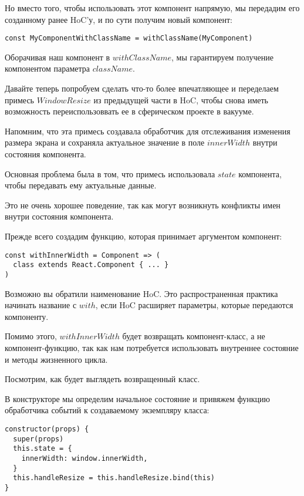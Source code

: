 Но вместо того, чтобы использовать этот компонент напрямую, мы передадим его созданному ранее HoC'у, и по сути получим новый компонент:

\begin{lstlisting}
const MyComponentWithClassName = withClassName(MyComponent)
\end{lstlisting}

Оборачивая наш компонент в $withClassName$, мы гарантируем получение компонентом параметра $className$.

Давайте теперь попробуем сделать что-то более впечатляющее и переделаем примесь $WindowResize$ из предыдущей части в HoC, чтобы снова иметь возможность переиспользоввать ее в сферическом проекте в вакууме.

Напомним, что эта примесь создавала обработчик для отслеживания изменения размера экрана и сохраняла актуальное значение в поле $innerWidth$ внутри состояния компонента.

Основная проблема была в том, что примесь использовала $state$ компонента, чтобы передавать ему актуальные данные.

Это не очень хорошее поведение, так как могут возникнуть конфликты имен внутри состояния компонента.

Прежде всего создадим функцию, которая принимает аргументом компонент:

\begin{lstlisting}
const withInnerWidth = Component => (
  class extends React.Component { ... }
)
\end{lstlisting}

Возможно вы обратили наименование HoC. Это распространенная практика начинать название с $with$, если HoC расширяет параметры, которые передаются компоненту.

Помимо этого, $withInnerWidth$ будет возвращать компонент-класс, а не компонент-функцию, так как нам потребуется использовать внутреннее состояние и методы жизненного цикла.

Посмотрим, как будет выглядеть возвращенный класс.

В конструкторе мы определим начальное состояние и привяжем функцию обработчика событий к создаваемому экземпляру класса:

\begin{lstlisting}
constructor(props) {
  super(props)
  this.state = {
    innerWidth: window.innerWidth,
  }
  this.handleResize = this.handleResize.bind(this)
}
\end{lstlisting}

